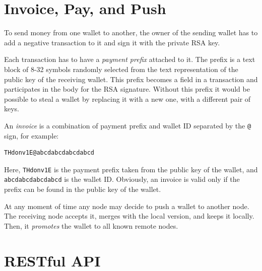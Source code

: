 \documentclass[11pt,oneside]{article}
\newcommand\dd[1]{\colorbox{gray!30}{\texttt{#1}}}
\begin{document}
\section{Invoice, Pay, and Push}\label{sec:pay}

To send money from one wallet to another, the owner of the sending wallet
has to add a negative transaction to it and sign it with the private RSA key.

Each transaction has to have a \emph{payment prefix} attached to it.
The prefix is a text block of 8-32 symbols randomly selected from the
text representation of the public key of the receiving wallet. This prefix
becomes a field in a transaction and participates in the body for the RSA
signature. Without this prefix it would be possible to steal a wallet by
replacing it with a new one, with a different pair of keys.

An \emph{invoice} is a combination of payment prefix and wallet ID separated
by the \dd{@} sign, for example:

\begin{verbatim}
THdonv1E@abcdabcdabcdabcd
\end{verbatim}

Here, \dd{THdonv1E} is the payment prefix taken from the public key of
the wallet, and \dd{abcdabcdabcdabcd} is the wallet ID. Obviously, an
invoice is valid only if the prefix can be found in the public key of the wallet.

At any moment of time any node may decide to push a wallet to another node.
The receiving node accepts it, merges with the local version, and keeps it locally.
Then, it \emph{promotes} the wallet to all known remote nodes.

\section{RESTful API}\label{sec:api}
\end{document}
